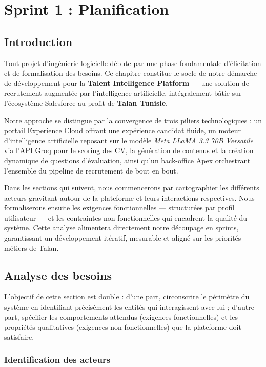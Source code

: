 \chapter{Sprint 1 : Planification}

\label{sec:organisme}

\section{Introduction}

Tout projet d'ingénierie logicielle débute par une phase fondamentale d'élicitation et de formalisation des besoins. Ce chapitre constitue le socle de notre démarche de développement pour la \textbf{Talent Intelligence Platform} — une solution de recrutement augmentée par l'intelligence artificielle, intégralement bâtie sur l'écosystème Salesforce au profit de \textbf{Talan Tunisie}.

Notre approche se distingue par la convergence de trois piliers technologiques : un portail Experience Cloud offrant une expérience candidat fluide, un moteur d'intelligence artificielle reposant sur le modèle \textit{Meta LLaMA 3.3 70B Versatile} via l'API Groq pour le scoring des CV, la génération de contenus et la création dynamique de questions d'évaluation, ainsi qu'un back-office Apex orchestrant l'ensemble du pipeline de recrutement de bout en bout.

Dans les sections qui suivent, nous commencerons par cartographier les différents acteurs gravitant autour de la plateforme et leurs interactions respectives. Nous formaliserons ensuite les exigences fonctionnelles — structurées par profil utilisateur — et les contraintes non fonctionnelles qui encadrent la qualité du système. Cette analyse alimentera directement notre découpage en sprints, garantissant un développement itératif, mesurable et aligné sur les priorités métiers de Talan.

\section{Analyse des besoins}

L'objectif de cette section est double : d'une part, circonscrire le périmètre du système en identifiant précisément les entités qui interagissent avec lui ; d'autre part, spécifier les comportements attendus (exigences fonctionnelles) et les propriétés qualitatives (exigences non fonctionnelles) que la plateforme doit satisfaire.

\subsection{Identification des acteurs}

